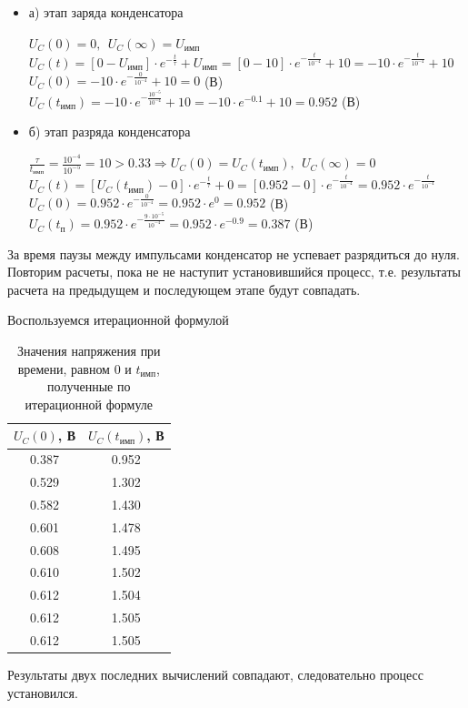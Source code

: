 \begin{itemize}
\item[] а) этап заряда конденсатора

		$U_C(0) = 0,\ \ U_C(\infty) = U_\text{имп}$\\	
		$U_C(t) = [0 - U_\text{имп}] \cdot e^{-\frac{t}{\tau}} + U_\text{имп} = [0 - 10] \cdot e^{-\frac{t}{10^{-4}}} + 10 = -10 \cdot e^{-\frac{t}{10^{-4}}} + 10$\\
		$U_C(0) = -10 \cdot e^{-\frac{0}{10^{-4}}} + 10 = 0$ (В)\\
		$U_C(t_\text{имп}) = -10 \cdot e^{-\frac{10^{-5}}{10^{-4}}} + 10 = -10 \cdot e^{-0.1} + 10 = 0.952$ (В)\\
		
\item[] б) этап разряда конденсатора
	
		$\frac{\tau}{t_\text{имп}} = \frac{10^{-4}}{10^{-5}} = 10 > 0.33 \Rightarrow U_C(0) = U_C(t_\text{имп}),\ \ U_C(\infty) = 0$\\
		$U_C(t) = [U_C(t_\text{имп}) - 0] \cdot e^{-\frac{t}{\tau}} + 0 =  [0.952 - 0] \cdot e^{-\frac{t}{10^{-4}}} = 0.952 \cdot e^{-\frac{t}{10^{-4}}}$\\
		$U_C(0) = 0.952 \cdot e^{-\frac{0}{10^{-4}}} = 0.952 \cdot e^0 = 0.952$ (В)\\
		$U_C(t_\text{п}) = 0.952 \cdot e^{-\frac{9 \cdot 10^{-5}}{10^{-4}}} = 0.952 \cdot e^{-0.9} = 0.387$ (В)\\
		
\end{itemize}

	За время паузы между импульсами конденсатор не успевает разрядиться до нуля. Повторим расчеты, пока не не наступит установившийся процесс, т.е. результаты расчета на предыдущем и последующем этапе будут совпадать.	
	
	Воспользуемся итерационной формулой
\begin{table}[H]

	\begin{center}
	\caption{Значения напряжения при времени, равном $0$ и $t_\text{имп}$, полученные по итерационной формуле}
	\begin{tabular}{|c|c|}
		\hline 
		$U_C(0)$, В & $U_C(t_\text{имп})$, В \\ 
		\hline 
		0.387 & 0.952 \\ 
		\hline 
		0.529 & 1.302 \\ 
		\hline 
		0.582 & 1.430 \\ 
		\hline 
		0.601 & 1.478 \\ 
		\hline 
		0.608 & 1.495 \\ 
		\hline 
		0.610 & 1.502 \\ 
		\hline 
		0.612 & 1.504 \\ 
		\hline 
		0.612 & 1.505 \\ 
		\hline 
		0.612 & 1.505 \\
		\hline 
		\end{tabular} 	
		
	\end{center}
\end{table}
	Результаты двух последних вычислений совпадают, следовательно процесс установился.\\
	
